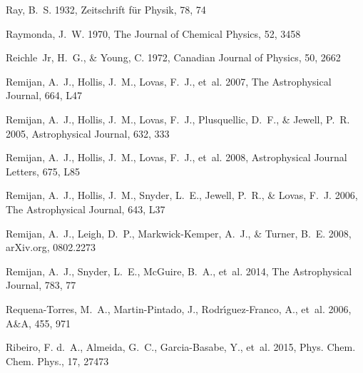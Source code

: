 \documentclass[twocolumn]{aastex631}
\begin{document}
\begin{thebibliography}{}
Ray, B.~S. 1932, Zeitschrift f{\"u}r Physik, 78, 74

Raymonda, J.~W. 1970, The Journal of Chemical Physics, 52, 3458

Reichle~Jr, H.~G., \& Young, C. 1972, Canadian Journal of Physics, 50, 2662

Remijan, A.~J., Hollis, J.~M., Lovas, F.~J., {et~al.} 2007, The Astrophysical
  Journal, 664, L47

Remijan, A.~J., Hollis, J.~M., Lovas, F.~J., Plusquellic, D.~F., \& Jewell,
  P.~R. 2005, Astrophysical Journal, 632, 333

Remijan, A.~J., Hollis, J.~M., Lovas, F.~J., {et~al.} 2008{},
  Astrophysical Journal Letters, 675, L85

Remijan, A.~J., Hollis, J.~M., Snyder, L.~E., Jewell, P.~R., \& Lovas, F.~J.
  2006, The Astrophysical Journal, 643, L37

Remijan, A.~J., Leigh, D.~P., Markwick-Kemper, A.~J., \& Turner, B.~E.
  2008{}, arXiv.org, 0802.2273

Remijan, A.~J., Snyder, L.~E., McGuire, B.~A., {et~al.} 2014, The Astrophysical
  Journal, 783, 77

Requena-Torres, M.~A., Martin-Pintado, J., Rodr{\'\i}guez-Franco, A., {et~al.}
  2006, A{\&}A, 455, 971

Ribeiro, F. d.~A., Almeida, G.~C., Garcia-Basabe, Y., {et~al.} 2015, Phys.
  Chem. Chem. Phys., 17, 27473


\end{thebibliography}
\end{document}
